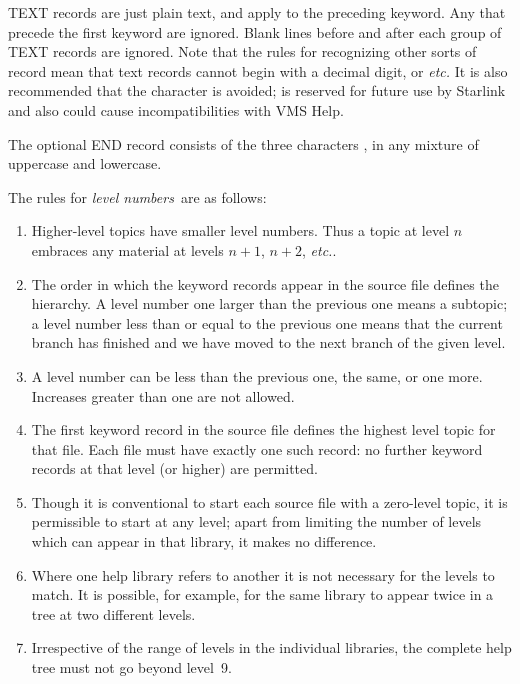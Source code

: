 \documentclass[11pt,nolof]{starlink}
\providecommand{\qt}[1]{``{\tt{#1}}''}
\providecommand{\fstring}[1]{\hbox{\hspace{0.05em}{\qt{#1}}\hspace{0.05em}}}
\begin{document}
TEXT records are just plain text, and apply to the preceding keyword.
Any that precede the first keyword are
ignored.  Blank lines before and after each group of TEXT records
are ignored.  Note that the rules for recognizing other sorts of
record mean that text records cannot begin with a decimal digit,
\fstring{@} or \fstring{END} \textit{etc.}  It
is also recommended that the character \fstring{/} is avoided;
\fstring{/} is reserved for future use by Starlink and also could
cause incompatibilities with VMS Help.

The optional END record consists of the three characters \fstring{END}, in
any mixture of uppercase and lowercase.

The rules for \textit{level numbers}\, are as follows:
\begin{enumerate}
\item Higher-level topics have smaller level numbers.  Thus a topic at
level $n$ embraces any material at levels $n+1$, $n+2$, \textit{etc.}.
\item The order in which the keyword records appear in the source file
defines the hierarchy.  A level number one larger than the previous
one means a subtopic; a level number less than or equal to the previous one
means that the current branch has finished and we have moved
to the next branch of the given level.
\item A level number can be less than the previous one, the same,
or one more.  Increases greater than one are not allowed.
\item The first keyword record in the source file defines the
highest level topic for that file.  Each file must have exactly
one such record:  no further keyword records at that level (or higher)
are permitted.
\item Though it is conventional to start each source file with a
zero-level topic, it is permissible to start at any level; apart
from limiting the number of levels which can appear in that
library, it makes no difference.
\item Where one help library refers to another it is not necessary for
the levels to match.  It is possible, for example, for the same
library to appear twice in a tree at two different levels.
\item Irrespective of the range of levels in the
individual libraries, the complete help tree must not go beyond
level~9.
\end{enumerate}
\end{document}
